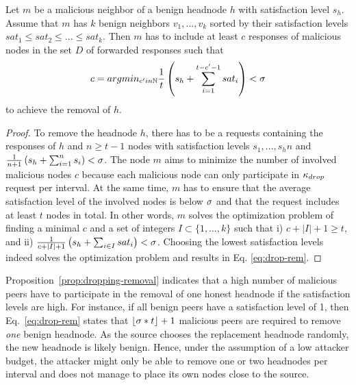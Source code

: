 \begin{proposition}
\label{prop:dropping-removal}
Let $m$ be a malicious neighbor of a benign headnode $h$ with satisfaction level $s_h$. Assume that $m$ has $k$ benign neighbors $v_1, \ldots , v_k$ sorted by their satisfaction levels $sat_1 \leq sat_2 \leq \ldots  \leq sat_k$. 
Then $m$ has to include at least $c$ responses of malicious nodes in the set $D$ of forwarded responses such that
\begin{align}
\label{eq:drop-rem}
c = argmin_{c' in \mathbb{N}} \frac{1}{t}\left(s_h+\sum_{i=1}^{t-c'-1}sat_i \right) < \satThres
\end{align}
to achieve the removal of $h$. 
\end{proposition}
\begin{proof}
To remove the headnode $h$, there has to be a \drop requests containing the responses of $h$ and $n\geq t-1$ nodes with satisfaction levels $s_1, \ldots , s_hn$ and 
$\frac{1}{n+1}\left( s_h + \sum_{i=1}^{n}s_i \right) < \sigma$.
The node $m$ aims to minimize the number of involved malicious nodes $c$ because each malicious node can only participate in $\kappa_{drop}$ \drop request per interval. At the same time, $m$ has to ensure that the average satisfaction level of the involved nodes is below $\sigma$ and that the request includes at least $t$ nodes in total.
In other words, $m$ solves the optimization problem of finding a minimal $c$ and a set of integers $I \subset \{1, \ldots, k\}$ such that i) $c + |I|+1 \geq t$, and ii) $\frac{1}{c + |I|+1}\left( s_h + \sum_{i \in I} sat_i \right) < \sigma$. 
Choosing the lowest satisfaction levels indeed solves the optimization problem and results in Eq. \ref{eq:drop-rem}. 
\end{proof}

Proposition~\ref{prop:dropping-removal} indicates that a high number of malicious peers have to participate in the removal of one honest headnode if the satisfaction levels are high. 
For instance, if all benign peers have a satisfaction level of 1, then Eq.~\ref{eq:drop-rem} states that $\lfloor \sigma*t \rfloor +1$ malicious peers are required to remove \emph{one} benign headnode. As the source chooses the replacement headnode  randomly, the new headnode is likely benign. Hence, under the assumption of a low attacker budget, the attacker might only be able to remove one or two headnodes per interval and does not manage to place its own nodes close to the source. 

